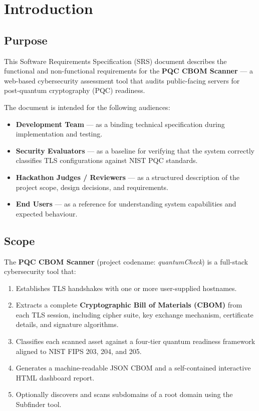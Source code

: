 \chapter{Introduction}
\label{chap:introduction}

\section{Purpose}
\label{sec:purpose}

This Software Requirements Specification (SRS) document describes the functional and
non-functional requirements for the \textbf{PQC CBOM Scanner} — a web-based
cybersecurity assessment tool that audits public-facing servers for post-quantum
cryptography (PQC) readiness.

The document is intended for the following audiences:

\begin{itemize}[noitemsep]
  \item \textbf{Development Team} — as a binding technical specification during
        implementation and testing.
  \item \textbf{Security Evaluators} — as a baseline for verifying that the system
        correctly classifies TLS configurations against NIST PQC standards.
  \item \textbf{Hackathon Judges / Reviewers} — as a structured description of the
        project scope, design decisions, and requirements.
  \item \textbf{End Users} — as a reference for understanding system capabilities
        and expected behaviour.
\end{itemize}

\section{Scope}
\label{sec:scope}

The \textbf{PQC CBOM Scanner} (project codename: \textit{quantumCheck}) is a
full-stack cybersecurity tool that:

\begin{enumerate}[noitemsep]
  \item Establishes TLS handshakes with one or more user-supplied hostnames.
  \item Extracts a complete \textbf{Cryptographic Bill of Materials (CBOM)} from
        each TLS session, including cipher suite, key exchange mechanism,
        certificate details, and signature algorithms.
  \item Classifies each scanned asset against a four-tier quantum readiness
        framework aligned to NIST FIPS 203, 204, and 205.
  \item Generates a machine-readable JSON CBOM and a self-contained interactive
        HTML dashboard report.
  \item Optionally discovers and scans subdomains of a root domain using the
        Subfinder tool.
\end{enumerate}

